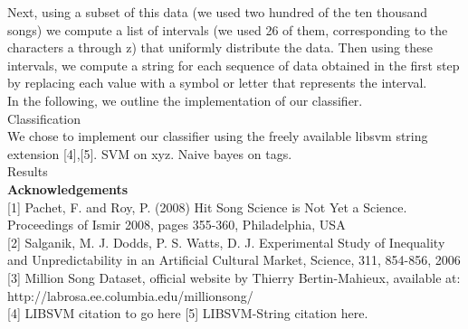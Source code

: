 \documentclass[11pt]{amsart}
\begin{document}
Next, using a subset of this data (we used two hundred of the ten thousand songs) we compute a list of intervals (we used 26 of them, corresponding to the characters a through z) that uniformly distribute the data. Then using these intervals, we compute a string for each sequence of data obtained in the first step by replacing each value with a symbol or letter that represents the interval. \\

In the following, we outline the implementation of our classifier. \\

{\huge Classification \huge} \\
We chose to implement our classifier using the freely available libsvm string extension [4],[5]. 
SVM on xyz. Naive bayes on tags.\\

{\huge Results \huge} \\

{\bf Acknowledgements \bf} \\

[1] Pachet, F. and Roy, P. (2008) Hit Song Science is Not Yet a Science. Proceedings of Ismir 2008, pages 355-360, Philadelphia, USA \\

[2] Salganik, M. J. Dodds, P. S. Watts, D. J. Experimental Study of Inequality and Unpredictability in an Artificial Cultural Market, Science, 311, 854-856, 2006 \\

[3] Million Song Dataset, official website by Thierry Bertin-Mahieux, available at: \\ 
http://labrosa.ee.columbia.edu/millionsong/ \\

[4] LIBSVM citation to go here
[5] LIBSVM-String citation here. 
\end{document}
